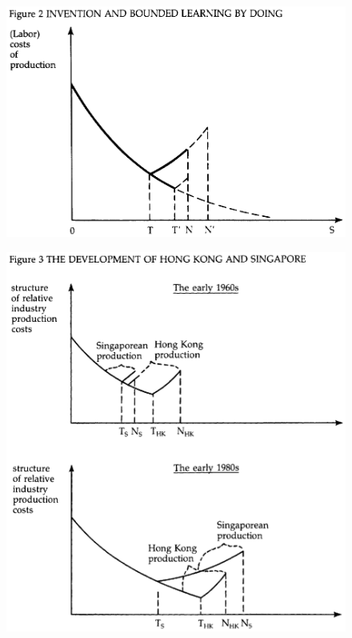 \documentclass{beamer}
\begin{document}
\begin{frame}
  \begin{figure}
    \includegraphics[scale=.8]{young3.eps}
  \end{figure}
\end{frame}

\begin{frame}
  \begin{figure}
    \includegraphics[scale=.7]{young4.eps}
  \end{figure}
\end{frame}
\end{document}
